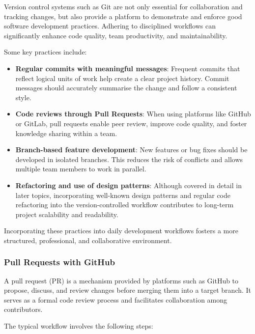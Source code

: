 \documentclass{article}
\begin{document}
Version control systems such as Git are not only essential for collaboration and tracking changes, but also provide a platform to demonstrate and enforce good software development practices. Adhering to disciplined workflows can significantly enhance code quality, team productivity, and maintainability.

Some key practices include:

\begin{itemize}
    \item \textbf{Regular commits with meaningful messages}: Frequent commits that reflect logical units of work help create a clear project history. Commit messages should accurately summarise the change and follow a consistent style.
    
    \item \textbf{Code reviews through Pull Requests}: When using platforms like GitHub or GitLab, pull requests enable peer review, improve code quality, and foster knowledge sharing within a team.
    
    \item \textbf{Branch-based feature development}: New features or bug fixes should be developed in isolated branches. This reduces the risk of conflicts and allows multiple team members to work in parallel.
    
    \item \textbf{Refactoring and use of design patterns}: Although covered in detail in later topics, incorporating well-known design patterns and regular code refactoring into the version-controlled workflow contributes to long-term project scalability and readability.
\end{itemize}

Incorporating these practices into daily development workflows fosters a more structured, professional, and collaborative environment.

\subsubsection{Pull Requests with GitHub}

A pull request (PR) is a mechanism provided by platforms such as GitHub to propose, discuss, and review changes before merging them into a target branch. It serves as a formal code review process and facilitates collaboration among contributors.

The typical workflow involves the following steps:
\end{document}
